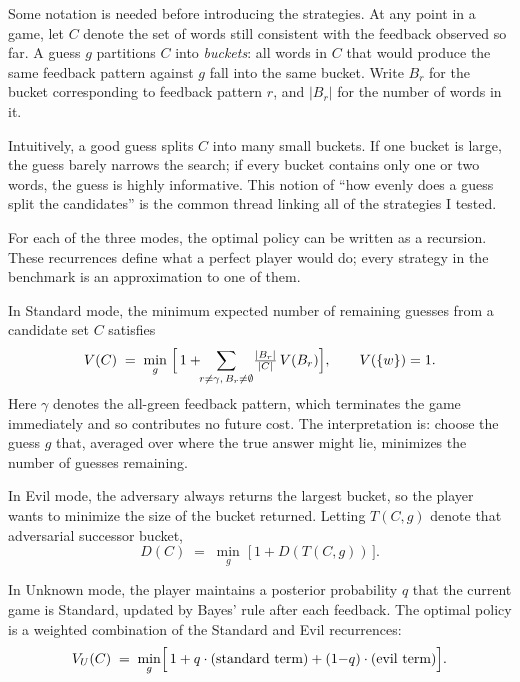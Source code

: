\documentclass[11pt]{article}
\newcommand{\evilT}{T}
\begin{document}
Some notation is needed before introducing the strategies. At any
point in a game, let $C$ denote the set of words still consistent with
the feedback observed so far. A guess $g$ partitions $C$ into
\emph{buckets}: all words in $C$ that would produce the same feedback
pattern against $g$ fall into the same bucket. Write $B_r$ for the
bucket corresponding to feedback pattern $r$, and $|B_r|$ for the
number of words in it.

Intuitively, a good guess splits $C$ into many small buckets. If one
bucket is large, the guess barely narrows the search; if every bucket
contains only one or two words, the guess is highly informative. This
notion of ``how evenly does a guess split the candidates'' is the
common thread linking all of the strategies I tested.

For each of the three modes, the optimal policy can be written as a
recursion. These recurrences define what a perfect player would do;
every strategy in the benchmark is an approximation to one of them.

In Standard mode, the minimum expected number of remaining guesses from
a candidate set $C$ satisfies
\begin{equation}
  V(C) \;=\; \min_{g}\;\Bigl[\,1 + \!\!\sum_{r \ne \gamma,\,B_r \ne \emptyset}\!
               \tfrac{|B_r|}{|C|}\,V(B_r)\Bigr],
  \qquad V(\{w\}) = 1.
  \label{eq:VC}
\end{equation}
Here $\gamma$ denotes the all-green feedback pattern, which terminates
the game immediately and so contributes no future cost. The
interpretation is: choose the guess $g$ that, averaged over where the
true answer might lie, minimizes the number of guesses remaining.

In Evil mode, the adversary always returns the largest bucket, so the
player wants to minimize the size of the bucket returned. Letting
$\evilT(C, g)$ denote that adversarial successor bucket,
\begin{equation}
  D(C) \;=\; \min_{g}\;\bigl[\,1 + D(\evilT(C, g))\,\bigr].
  \label{eq:DC}
\end{equation}

In Unknown mode, the player maintains a posterior probability $q$ that
the current game is Standard, updated by Bayes' rule after each
feedback. The optimal policy is a weighted combination of the Standard
and Evil recurrences:
\begin{equation}
  V_U(C) \;=\; \min_{g}\Bigl[\,1 + q\cdot(\text{standard term})
                              + (1{-}q)\cdot(\text{evil term})\Bigr].
\end{equation}
\end{document}

